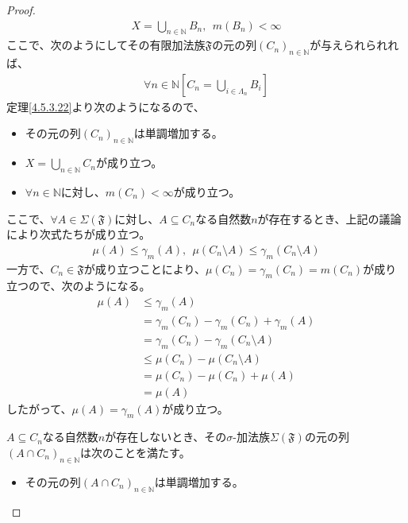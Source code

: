 \documentclass[dvipdfmx]{jsarticle}
\begin{document}
\begin{proof}
\begin{align*}
X = \bigcup_{n \in \mathbb{N}} B_{n},\ \ m\left( B_{n} \right) < \infty
\end{align*}
ここで、次のようにしてその有限加法族$\mathfrak{F}$の元の列$\left( C_{n} \right)_{n \in \mathbb{N}}$が与えられられれば、
\begin{align*}
\forall n \in \mathbb{N}\left[ C_{n} = \bigcup_{i \in \varLambda_{n}} B_{i} \right]
\end{align*}
定理\ref{4.5.3.22}より次のようになるので、
\begin{itemize}
\item
  その元の列$\left( C_{n} \right)_{n \in \mathbb{N}}$は単調増加する。
\item
  $X = \bigcup_{n \in \mathbb{N}} C_{n}$が成り立つ。
\item
  $\forall n \in \mathbb{N}$に対し、$m\left( C_{n} \right) < \infty$が成り立つ。
\end{itemize}
ここで、$\forall A \in \varSigma\left( \mathfrak{F} \right)$に対し、$A \subseteq C_{n}$なる自然数$n$が存在するとき、上記の議論により次式たちが成り立つ。
\begin{align*}
\mu(A) \leq \gamma_{m}(A),\ \ \mu\left( C_{n} \setminus A \right) \leq \gamma_{m}\left( C_{n} \setminus A \right)
\end{align*}
一方で、$C_{n}\in \mathfrak{F}$が成り立つことにより、$\mu\left( C_{n} \right) = \gamma_{m}\left( C_{n} \right) = m\left( C_{n} \right)$が成り立つので、次のようになる。
\begin{align*}
\mu(A) &\leq \gamma_{m}(A)\\
&= \gamma_{m}\left( C_{n} \right) - \gamma_{m}\left( C_{n} \right) + \gamma_{m}(A)\\
&= \gamma_{m}\left( C_{n} \right) - \gamma_{m}\left( C_{n} \setminus A \right)\\
&\leq \mu\left( C_{n} \right) - \mu\left( C_{n} \setminus A \right)\\
&= \mu\left( C_{n} \right) - \mu\left( C_{n} \right) + \mu(A)\\
&= \mu(A)
\end{align*}
したがって、$\mu(A) = \gamma_{m}(A)$が成り立つ。\par
$A \subseteq C_{n}$なる自然数$n$が存在しないとき、その$\sigma$-加法族$\varSigma\left( \mathfrak{F} \right)$の元の列$\left( A \cap C_{n} \right)_{n \in \mathbb{N}}$は次のことを満たす。
\begin{itemize}
\item
  その元の列$\left( A \cap C_{n} \right)_{n \in \mathbb{N}}$は単調増加する。

\end{itemize}
\end{proof}
\end{document}
